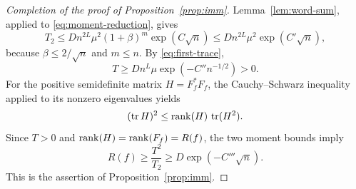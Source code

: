 \begin{proof}[Completion of the proof of Proposition~\ref{prop:imm}]
Lemma~\ref{lem:word-sum}, applied to \eqref{eq:moment-reduction}, gives
\[
 T_2\le D n^{2L}\mu^2(1+\beta)^m\exp(C\sqrt n)
      \le D n^{2L}\mu^2\exp(C'\sqrt n),
\]
because $\beta\le2/\sqrt n$ and $m\le n$.
By \eqref{eq:first-trace},
\[
 T\ge Dn^L\mu\exp(-C''n^{-1/2})>0.
\]
For the positive semidefinite matrix $H=F_f^*F_f$, the
Cauchy--Schwarz inequality applied to its nonzero eigenvalues yields
\[
 (\operatorname{tr} H)^2\le\operatorname{rank}(H)\,\operatorname{tr}(H^2).
\]
Since $T>0$ and $\operatorname{rank}(H)=\operatorname{rank}(F_f)=R(f)$, the two moment bounds imply
\[
 R(f)\ge\frac{T^2}{T_2}
       \ge D\exp(-C'''\sqrt n).
\]
This is the assertion of Proposition~\ref{prop:imm}.
\end{proof}
